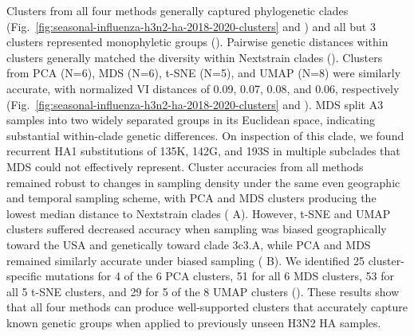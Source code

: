 \documentclass[10pt,letterpaper]{article}
\begin{document}
Clusters from all four methods generally captured phylogenetic clades (Fig.~\ref{fig:seasonal-influenza-h3n2-ha-2018-2020-clusters} and ) and all but 3 clusters represented monophyletic groups ().
Pairwise genetic distances within clusters generally matched the diversity within Nextstrain clades ().
Clusters from PCA (N=6), MDS (N=6), t-SNE (N=5), and UMAP (N=8) were similarly accurate, with normalized VI distances of 0.09, 0.07, 0.08, and 0.06, respectively (Fig.~\ref{fig:seasonal-influenza-h3n2-ha-2018-2020-clusters} and ).
MDS split A3 samples into two widely separated groups in its Euclidean space, indicating substantial within-clade genetic differences.
On inspection of this clade, we found recurrent HA1 substitutions of 135K, 142G, and 193S in multiple subclades that MDS could not effectively represent.
Cluster accuracies from all methods remained robust to changes in sampling density under the same even geographic and temporal sampling scheme, with PCA and MDS clusters producing the lowest median distance to Nextstrain clades ( A).
However, t-SNE and UMAP clusters suffered decreased accuracy when sampling was biased geographically toward the USA and genetically toward clade 3c3.A, while PCA and MDS remained similarly accurate under biased sampling ( B).
We identified 25 cluster-specific mutations for 4 of the 6 PCA clusters, 51 for all 6 MDS clusters, 53 for all 5 t-SNE clusters, and 29 for 5 of the 8 UMAP clusters ().
These results show that all four methods can produce well-supported clusters that accurately capture known genetic groups when applied to previously unseen H3N2 HA samples.
\end{document}

